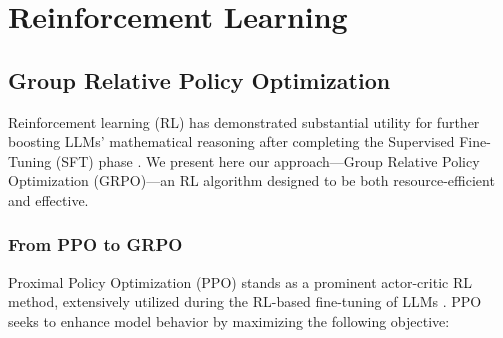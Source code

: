 \section{Reinforcement Learning}

\subsection{Group Relative Policy Optimization} Reinforcement learning (RL) has demonstrated substantial utility for further boosting LLMs’ mathematical reasoning after completing the Supervised Fine-Tuning (SFT) phase \citep{wang2023math,wizardmath}. We present here our approach—Group Relative Policy Optimization (GRPO)—an RL algorithm designed to be both resource-efficient and effective.

\subsubsection{From PPO to GRPO} Proximal Policy Optimization (PPO) \citep{schulman2017proximal} stands as a prominent actor-critic RL method, extensively utilized during the RL-based fine-tuning of LLMs \citep{ouyang2022training}. PPO seeks to enhance model behavior by maximizing the following objective:

